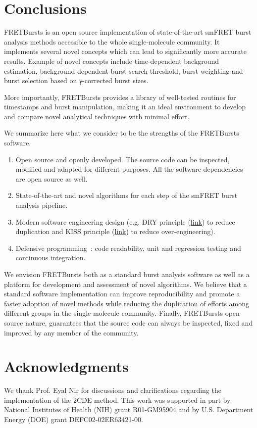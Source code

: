 \section{Conclusions}
\label{sec:conclusions}

FRETBursts is an open source implementation of state-of-the-art smFRET burst analysis methods
accessible to the whole single-molecule community.
It implements several novel concepts which can lead
to significantly more accurate results. Example of novel concepts include
time-dependent background estimation, background dependent burst search threshold,
burst weighting and burst selection based on γ-corrected burst sizes.

More importantly, FRETBursts provides a library of well-tested routines
for timestamps and burst manipulation, making it an ideal environment to
develop and compare novel analytical techniques with minimal effort.

We summarize here what we consider to be the strengths
of the FRETBursts software.

\begin{enumerate}
\item Open source and openly developed. The source code can be inspected, modified and
adapted for different purposes. All the software dependencies are open source as well.
\item State-of-the-art and novel algorithms for each step of the
smFRET burst analysis pipeline.
\item Modern software engineering design (e.g. DRY principle
(\href{http://en.wikipedia.org/wiki/Don\%27t_repeat_yourself}{link})
to reduce duplication and KISS principle
(\href{http://en.wikipedia.org/wiki/KISS_principle}{link})
to reduce over-engineering).
\item Defensive programming~\cite{Prli__2012}: code readability,
unit and regression testing and continuous integration.
\end{enumerate}

We envision FRETBursts both as a standard burst analysis
software as well as a platform for development and assessment of novel algorithms.
We believe that a standard software implementation can improve
reproducibility and promote a faster adoption of novel methods 
while reducing the duplication of efforts among different groups
in the single-molecule community.
Finally, FRETBursts open source nature, guarantees that the source code
can always be inspected, fixed and improved
by any member of the community.


\section*{Acknowledgments}
We thank Prof. Eyal Nir for discussions and clarifications regarding the 
implementation of the 2CDE method.
This work was supported in part by National Institutes of Health (NIH)
grant R01-GM95904 and by U.S. Department Energy (DOE) grant DEFC02-02ER63421-00.
